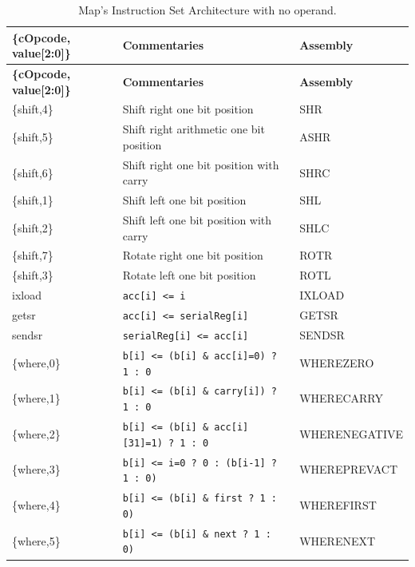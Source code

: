 {\small
{\centering
\begin{longtable}{|l|l|l|}
\caption{Map's Instruction Set Architecture with no operand.}
\label{tab:map_isa} \\
\hline
\textbf{\{cOpcode, value[2:0]\}} & \textbf{Commentaries} & \textbf{Assembly} \\
\hline
\endfirsthead
\hline
\textbf{\{cOpcode, value[2:0]\}} & \textbf{Commentaries} & \textbf{Assembly} \\
\hline
\endhead
\hline
\endfoot
\hline
\endlastfoot
\{shift,4\}   & Shift right one bit position                     & SHR            \\ \hline
\{shift,5\}   & Shift right arithmetic one bit position          & ASHR           \\ \hline
\{shift,6\}   & Shift right one bit position with carry          & SHRC           \\ \hline
\{shift,1\}   & Shift left one bit position                      & SHL            \\ \hline
\{shift,2\}   & Shift left one bit position with carry           & SHLC           \\ \hline
\{shift,7\}   & Rotate right one bit position                    & ROTR           \\ \hline
\{shift,3\}   & Rotate left one bit position                     & ROTL           \\ \hline
ixload        & \texttt{acc[i] <= i}                             & IXLOAD         \\ \hline
getsr         & \texttt{acc[i] <= serialReg[i]}                  & GETSR          \\ \hline
sendsr        & \texttt{serialReg[i] <= acc[i]}                  & SENDSR         \\ \hline
\{where,0\}   & \texttt{b[i] <= (b[i] \& acc[i]=0) ? 1 : 0}       & WHEREZERO      \\ \hline
\{where,1\}   & \texttt{b[i] <= (b[i] \& carry[i]) ? 1 : 0}       & WHERECARRY     \\ \hline
\{where,2\}   & \texttt{b[i] <= (b[i] \& acc[i][31]=1) ? 1 : 0}   & WHERENEGATIVE  \\ \hline
\{where,3\}   & \texttt{b[i] <= i=0 ? 0 : (b[i-1] ? 1 : 0)}       & WHEREPREVACT   \\ \hline
\{where,4\}   & \texttt{b[i] <= (b[i] \& first ? 1 : 0)}          & WHEREFIRST     \\ \hline
\{where,5\}   & \texttt{b[i] <= (b[i] \& next ? 1 : 0)}           & WHERENEXT      \\ \hline

\end{longtable}}}
